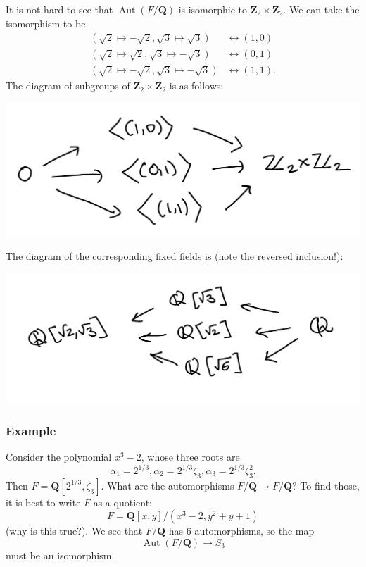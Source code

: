 \documentclass[11pt]{article}
\begin{document}
It is not hard to see that \(\operatorname{Aut}(F/\mathbf{Q})\)  is isomorphic to \(\mathbf{Z}_2 \times \mathbf{Z}_2\).
We can take the isomorphism to be
\begin{align*}
(\sqrt 2 \mapsto -\sqrt 2, \sqrt 3 \mapsto \sqrt 3) &\leftrightarrow (1,0) \\
(\sqrt 2 \mapsto \sqrt 2, \sqrt 3 \mapsto -\sqrt 3) &\leftrightarrow (0,1) \\
(\sqrt 2 \mapsto - \sqrt 2, \sqrt 3 \mapsto -\sqrt 3) &\leftrightarrow (1,1).
\end{align*}
The diagram of subgroups of \(\mathbf{Z}_2 \times \mathbf{Z}_2\) is as follows:

\begin{center}
\includegraphics[width=.9\linewidth]{assets/Course_notes/2023-04-18_13-47-16_screenshot.png}
\end{center}
The diagram of the corresponding fixed fields is (note the reversed inclusion!):

\begin{center}
\includegraphics[width=.9\linewidth]{assets/Course_notes/2023-04-18_13-48-27_screenshot.png}
\end{center}
\subsubsection{Example}
\label{sec:org143d78e}
Consider the polynomial \(x^3-2\), whose three roots are
\[ \alpha_1 = 2^{1/3}, \alpha_2 = 2^{1/3} \zeta_{3}, \alpha_3 = 2^{1/3}\zeta_3^{2}.\]
Then \(F = \mathbf{Q}[2^{1/3}, \zeta_3].\)
What are the automorphisms \(F/\mathbf{Q}\to F/\mathbf{Q}\)?
To find those, it is best to write \(F\) as a quotient:
\[ F = \mathbf{Q}[x,y]/(x^3-2, y^2+y+1)\]
(why is this true?).
We see that \(F / \mathbf{Q}\) has 6 automorphisms, so the map
\[ \operatorname{Aut}(F / \mathbf{Q}) \to S_3\]
must be an isomorphism.
\end{document}
